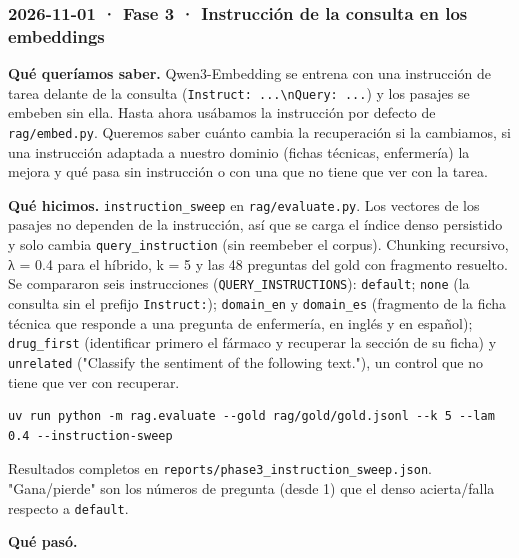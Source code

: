 \subsubsection{2026-11-01 · Fase 3 · Instrucción de la consulta en los embeddings}

\textbf{Qué queríamos saber.} Qwen3-Embedding se entrena con una instrucción de tarea delante de la
consulta (\texttt{Instruct: ...\textbackslash{}nQuery: ...}) y los pasajes se embeben sin ella. Hasta ahora usábamos la
instrucción por defecto de \texttt{rag/\allowbreak{}embed.py}. Queremos saber cuánto cambia la recuperación si la
cambiamos, si una instrucción adaptada a nuestro dominio (fichas técnicas, enfermería) la mejora
y qué pasa sin instrucción o con una que no tiene que ver con la tarea.

\textbf{Qué hicimos.} \texttt{instruction\_\allowbreak{}sweep} en \texttt{rag/\allowbreak{}evaluate.py}. Los vectores de los pasajes no dependen
de la instrucción, así que se carga el índice denso persistido y solo cambia \texttt{query\_\allowbreak{}instruction}
(sin reembeber el corpus). Chunking recursivo, λ = 0.4 para el híbrido, k = 5 y las 48 preguntas
del gold con fragmento resuelto. Se compararon seis instrucciones (\texttt{QUERY\_\allowbreak{}INSTRUCTIONS}):
\texttt{default}; \texttt{none} (la consulta sin el prefijo \texttt{Instruct:}); \texttt{domain\_\allowbreak{}en} y \texttt{domain\_\allowbreak{}es}
(fragmento de la ficha técnica que responde a una pregunta de enfermería, en inglés y en español);
\texttt{drug\_\allowbreak{}first} (identificar primero el fármaco y recuperar la sección de su ficha) y \texttt{unrelated}
("Classify the sentiment of the following text."), un control que no tiene que ver con recuperar.

\begin{lstlisting}
uv run python -m rag.evaluate --gold rag/gold/gold.jsonl --k 5 --lam 0.4 --instruction-sweep
\end{lstlisting}

Resultados completos en \texttt{reports/\allowbreak{}phase3\_\allowbreak{}instruction\_\allowbreak{}sweep.json}. "Gana/pierde" son los números de
pregunta (desde 1) que el denso acierta/falla respecto a \texttt{default}.

\textbf{Qué pasó.}

